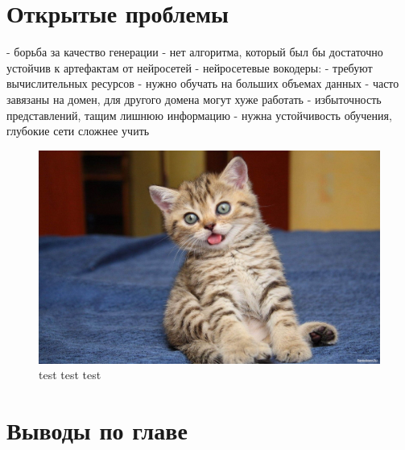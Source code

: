 \section{Открытые проблемы}
 - борьба за качество генерации
 - нет алгоритма, который был бы достаточно устойчив к артефактам от нейросетей
 - нейросетевые вокодеры:
   - требуют вычислительных ресурсов
   - нужно обучать на больших объемах данных
   - часто завязаны на домен, для другого домена могут хуже работать
 - избыточность представлений, тащим лишнюю информацию
 - нужна устойчивость обучения, глубокие сети сложнее учить

\begin{figure}[t]
  \centering
  \includegraphics[width=16cm]{figures/cat}
  \caption{test test test}
  \label{fig:test}
\end{figure}


\section{Выводы по главе}

